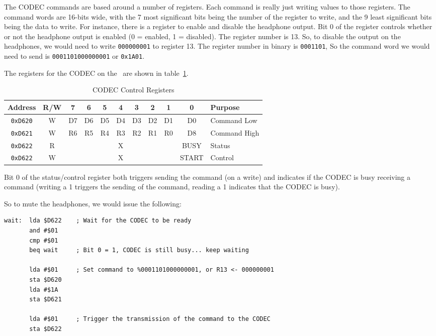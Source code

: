 The CODEC commands are based around a number of registers. Each command is really just writing values to those registers. The command words are 16-bits wide, with the 7 most significant bits being the number of the register to write, and the 9 least significant bits being the data to write. For instance, there is a register to enable and disable the headphone output. Bit 0 of the register controls whether or not the headphone output is enabled (0 = enabled, 1 = disabled). The register number is 13. So, to disable the output on the headphones, we would need to write \verb+000000001+ to register 13. The register number in binary is \verb+0001101+, So the command word we would need to send is \verb+0001101000000001+ or \verb+0x1A01+.

The registers for the CODEC on the \jr\ are shown in table~\ref{tab:codec_registers}.

\begin{table}[ht]
	\begin{center}
		\begin{tabular}{|c|c|c|c|c|c|c|c|c|c|l|} \hline
			Address & R/W & 7 & 6 & 5 & 4 & 3 & 2 & 1 & 0 & Purpose \\ \hline \hline
			\verb+0xD620+ & W & D7 & D6 & D5 & D4 & D3 & D2 & D1 & D0 & Command Low \\ \hline
			\verb+0xD621+ & W & R6 & R5 & R4 & R3 & R2 & R1 & R0 & D8 & Command High \\ \hline
			\verb+0xD622+ & R & \multicolumn{7}{|c|}{X} & BUSY & Status \\ \hline
			\verb+0xD622+ & W & \multicolumn{7}{|c|}{X} & START & Control \\ \hline
		\end{tabular}
		\caption{CODEC Control Registers}
	\end{center}
	\label{tab:codec_registers}
\end{table}

Bit 0 of the status/control register both triggers sending the command (on a write) and indicates if the CODEC is busy receiving a command (writing a 1 triggers the sending of the command, reading a 1 indicates that the CODEC is busy).

So to mute the headphones, we would issue the following:

\begin{verbatim}
wait:  lda $D622    ; Wait for the CODEC to be ready
       and #$01
       cmp #$01
       beq wait     ; Bit 0 = 1, CODEC is still busy... keep waiting

       lda #$01     ; Set command to %0001101000000001, or R13 <- 000000001
       sta $D620
       lda #$1A
       sta $D621

       lda #$01     ; Trigger the transmission of the command to the CODEC
       sta $D622
\end{verbatim}

